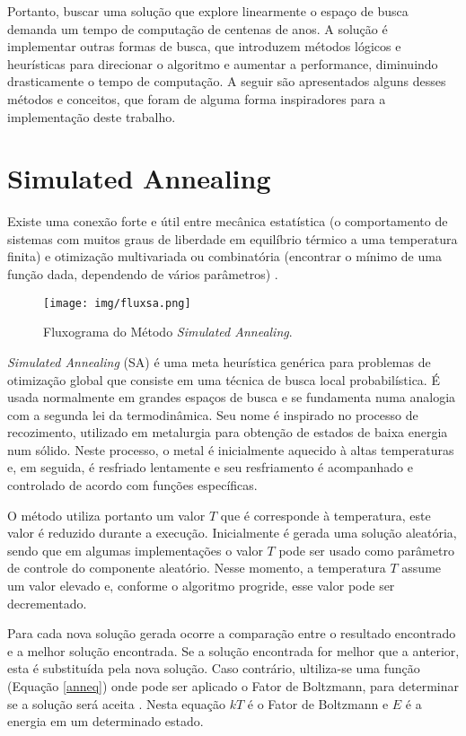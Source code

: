 \documentclass[dm,ppgcomp]{texfurg}
\begin{document}
Portanto, buscar uma solução que explore linearmente o espaço de busca demanda um tempo de computação de centenas de anos. A solução é implementar outras formas de busca, que introduzem métodos lógicos e heurísticas para direcionar o algoritmo e aumentar a performance, diminuindo drasticamente o tempo de computação. A seguir são apresentados alguns desses métodos e conceitos, que foram de alguma forma inspiradores para a implementação deste trabalho.

\section{Simulated Annealing}

Existe uma conexão forte e útil entre mecânica estatística (o comportamento de sistemas com muitos graus de liberdade em equilíbrio térmico a uma temperatura finita) e otimização multivariada ou combinatória (encontrar o mínimo de uma função dada, dependendo de vários parâmetros) \cite{brooks1995optimization}.

\begin{figure}[htbp]
  \centering \texttt{[image: img/fluxsa.png]}
\caption{Fluxograma do Método {\it Simulated Annealing}.} 
\label{fluxsa}
\end{figure}

{\it Simulated Annealing} (SA) é uma meta heurística genérica para problemas de otimização global que consiste em uma técnica de busca local probabilística. É usada normalmente em grandes espaços de busca e se fundamenta numa analogia com a segunda lei da termodinâmica. Seu nome é inspirado no processo de recozimento, utilizado em metalurgia para obtenção de estados de baixa energia num sólido. Neste processo, o metal é inicialmente aquecido à altas temperaturas e, em seguida, é resfriado lentamente e seu resfriamento é acompanhado e controlado de acordo com funções específicas. 

O método utiliza portanto um valor $T$ que é corresponde à temperatura, este valor é reduzido durante a execução. Inicialmente é gerada uma solução aleatória, sendo que em algumas implementações o valor $T$ pode ser usado como parâmetro de controle do componente aleatório. Nesse momento, a temperatura $T$ assume um valor elevado e, conforme o algoritmo progride, esse valor pode ser decrementado. 

Para cada nova solução gerada ocorre a comparação entre o resultado encontrado e a melhor solução encontrada. Se a solução encontrada for melhor que a anterior, esta é substituída pela nova solução. Caso contrário, ultiliza-se uma função (Equação \ref{anneq}) onde pode ser aplicado o Fator de Boltzmann, para determinar se a solução será aceita \cite{brooks1995optimization}. Nesta equação $kT$ é o Fator de Boltzmann e $E$ é a energia em um determinado estado.
\end{document}
